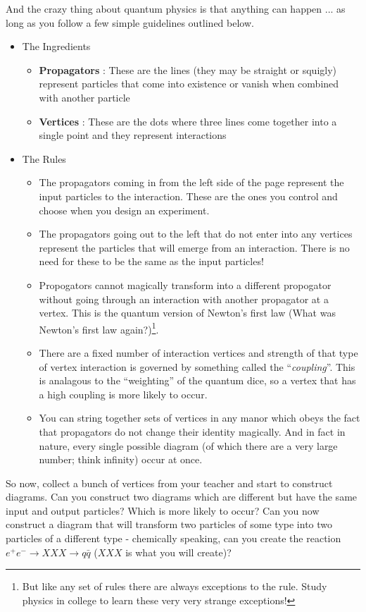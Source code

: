 \documentclass[12pt]{article}
\begin{document}
And the crazy thing about quantum physics is that anything can happen ... as long as you follow a few simple guidelines outlined below.
\begin{itemize}
\item The Ingredients
\begin{itemize}
\item \textbf{Propagators} : These are the lines (they may be straight or squigly) represent particles that come into existence or vanish when combined with another particle
\item \textbf{Vertices} : These are the dots where three lines come together into a single point and they represent interactions 
\end{itemize}
\item The Rules
\begin{itemize}
\item The propagators coming in from the left side of the page represent the input particles to the interaction.  These are the ones you control and choose when you design an experiment.
\item The propagators going out to the left that do not enter into any vertices represent the particles that will emerge from an interaction.  There is no need for these to be the same as the input particles!
\item Propogators cannot magically transform into a different propogator without going through an interaction with another propagator at a vertex.  This is the quantum version of Newton's first law (What was Newton's first law again?)\footnote{But like any set of rules there are always exceptions to the rule.  Study physics in college to learn these very very strange exceptions!}.
\item There are a fixed number of interaction vertices and strength of that type of vertex interaction is governed by something called the ``\textit{coupling}''.  This is analagous to the ``weighting'' of the quantum dice, so a vertex that has a high coupling is more likely to occur.
\item You can string together sets of vertices in any manor which obeys the fact that propagators do not change their identity magically.  And in fact in nature, every single possible diagram (of which there are a very large number; think infinity) occur at once.
\end{itemize}
\end{itemize}

So now, collect a bunch of vertices from your teacher and start to construct diagrams.  Can you construct two diagrams which are different but have the same input and output particles?  Which is more likely to occur?  Can you now construct a diagram that will transform two particles of some type into two particles of a different type - chemically speaking, can you create the reaction $e^{+}e^{-} \rightarrow XXX \rightarrow q\bar{q}$ ($XXX$ is what you will create)?  
\end{document}
